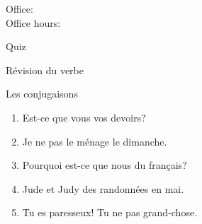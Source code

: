 \documentclass{beamer}
\subtitle[Loisirs faits et \lexi{faire}]{Les loisirs que nous faisons et le verbe \lexi{faire}}
\begin{document}
  \begin{frame}
    \titlepage
    \tiny{Office: \\
          Office hours: }
  \end{frame}

  \begin{frame}{}
    \begin{center}
      \Large Quiz
    \end{center}
  \end{frame}

  \begin{frame}{Révision du verbe }
    \begin{center}
      
    \end{center}
  \end{frame}

  \begin{frame}{Les conjugaisons}
    \begin{enumerate}
      \item Est-ce que vous \underline{} vos devoirs?
      \item Je ne \underline{} pas le ménage le dimanche.
      \item Pourquoi est-ce que nous \underline{} du français?
      \item Jude et Judy \underline{} des randonnées en mai.
      \item Tu es paresseux! Tu ne \underline{} pas grand-chose.
    \end{enumerate}
  \end{frame}
\end{document}
